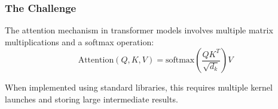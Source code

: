 \subsubsection{The Challenge}

The attention mechanism in transformer models involves multiple matrix multiplications and a softmax operation:
\begin{equation}
\text{Attention}(Q, K, V) = \text{softmax}\left(\frac{QK^T}{\sqrt{d_k}}\right)V
\end{equation}

When implemented using standard libraries, this requires multiple kernel launches and storing large intermediate results.

